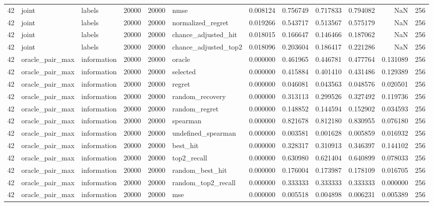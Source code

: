 \begin{tabular}{rllrrlrrrrrr}
42 & joint & labels & 20000 & 20000 & nmse & 0.008124 & 0.756749 & 0.717833 & 0.794082 & NaN & 256 \\
42 & joint & labels & 20000 & 20000 & normalized_regret & 0.019266 & 0.543717 & 0.513567 & 0.575179 & NaN & 256 \\
42 & joint & labels & 20000 & 20000 & chance_adjusted_hit & 0.018015 & 0.166647 & 0.146466 & 0.187062 & NaN & 256 \\
42 & joint & labels & 20000 & 20000 & chance_adjusted_top2 & 0.018096 & 0.203604 & 0.186417 & 0.221286 & NaN & 256 \\
42 & oracle_pair_max & information & 20000 & 20000 & oracle & 0.000000 & 0.461965 & 0.446781 & 0.477764 & 0.131089 & 256 \\
42 & oracle_pair_max & information & 20000 & 20000 & selected & 0.000000 & 0.415884 & 0.401410 & 0.431486 & 0.129389 & 256 \\
42 & oracle_pair_max & information & 20000 & 20000 & regret & 0.000000 & 0.046081 & 0.043563 & 0.048576 & 0.020501 & 256 \\
42 & oracle_pair_max & information & 20000 & 20000 & random_recovery & 0.000000 & 0.313113 & 0.299526 & 0.327492 & 0.119736 & 256 \\
42 & oracle_pair_max & information & 20000 & 20000 & random_regret & 0.000000 & 0.148852 & 0.144594 & 0.152902 & 0.034593 & 256 \\
42 & oracle_pair_max & information & 20000 & 20000 & spearman & 0.000000 & 0.821678 & 0.812180 & 0.830955 & 0.076180 & 256 \\
42 & oracle_pair_max & information & 20000 & 20000 & undefined_spearman & 0.000000 & 0.003581 & 0.001628 & 0.005859 & 0.016932 & 256 \\
42 & oracle_pair_max & information & 20000 & 20000 & best_hit & 0.000000 & 0.328317 & 0.310913 & 0.346397 & 0.144102 & 256 \\
42 & oracle_pair_max & information & 20000 & 20000 & top2_recall & 0.000000 & 0.630980 & 0.621404 & 0.640899 & 0.078033 & 256 \\
42 & oracle_pair_max & information & 20000 & 20000 & random_best_hit & 0.000000 & 0.176004 & 0.173987 & 0.178109 & 0.016705 & 256 \\
42 & oracle_pair_max & information & 20000 & 20000 & random_top2_recall & 0.000000 & 0.333333 & 0.333333 & 0.333333 & 0.000000 & 256 \\
42 & oracle_pair_max & information & 20000 & 20000 & mse & 0.000000 & 0.005518 & 0.004898 & 0.006231 & 0.005389 & 256 \\

\end{tabular}
